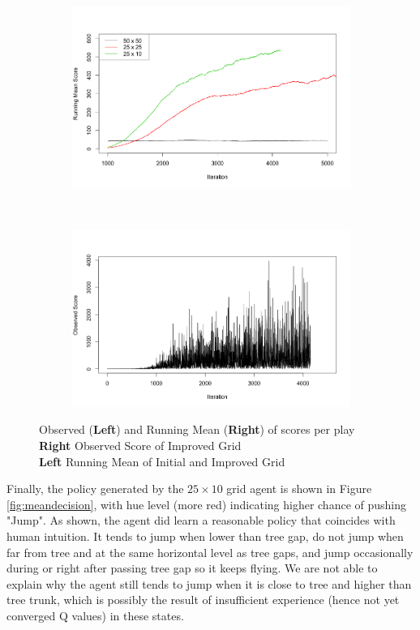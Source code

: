 \documentclass[11pt]{article}
\theoremstyle{definition}
\begin{document}
\begin{figure}[!h]
        \centering
        \begin{subfigure}[b]{0.5\textwidth}
                \includegraphics[width=\textwidth]{"./plots/peformance"}
        \end{subfigure}%
        ~
        \begin{subfigure}[b]{0.5\textwidth}
                \includegraphics[width=\textwidth]{"./plots/observed"}
        \end{subfigure}
  \caption{Observed (\textbf{Left}) and Running Mean (\textbf{Right}) of scores per play\\ 
  \textbf{Right} Observed Score of Improved Grid \\
  \textbf{Left} Running Mean of Initial and Improved Grid }
  \label{fig:Result}
\end{figure}

Finally, the policy generated by the $25 \times 10$ grid agent is shown in Figure \ref{fig:meandecision}, with hue level (more red) indicating higher chance of pushing "Jump". As shown, the agent did learn a reasonable policy that coincides with human intuition. It tends to jump when lower than tree gap, do not jump when far from tree and at the same horizontal level as tree gaps, and jump occasionally during or right after passing tree gap so it keeps flying. We are not able to explain why the agent still tends to jump when it is close to tree and higher than tree trunk, which is possibly the result of insufficient experience (hence not yet converged Q values) in these states. 
\end{document}
